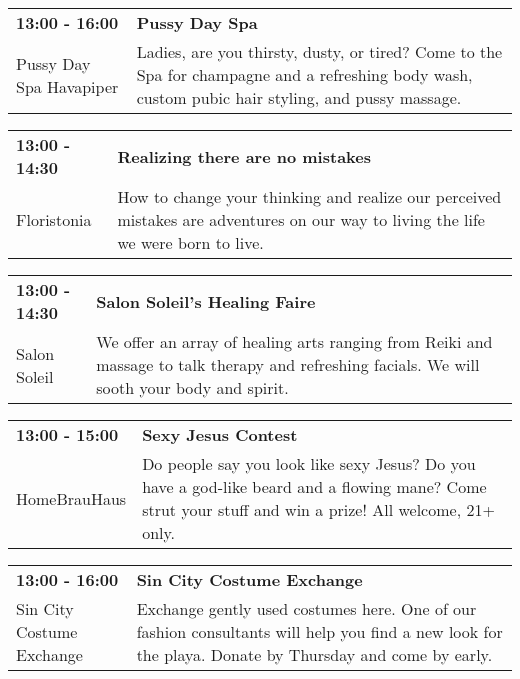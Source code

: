 \begin{tabular}{ p{1in} p{2.2in} }
    \textbf{13:00 - 16:00} & \textbf{Pussy Day Spa} \\
    Pussy Day Spa \newline Havapiper & Ladies, are you thirsty, dusty, or tired? Come to the Spa for champagne and a refreshing body wash, custom pubic hair styling, and pussy massage. \\
    \hline 
\end{tabular}
    
\begin{tabular}{ p{1in} p{2.2in} }
    \textbf{13:00 - 14:30} & \textbf{Realizing there are no mistakes} \\
    Floristonia \newline  & How to change your thinking and realize our perceived mistakes are adventures on our way to living the life we were born to live. \\
    \hline 
\end{tabular}
    
\begin{tabular}{ p{1in} p{2.2in} }
    \textbf{13:00 - 14:30} & \textbf{Salon Soleil's Healing Faire} \\
    Salon Soleil \newline  & We offer an array of healing arts ranging from Reiki and massage to talk therapy and refreshing facials. We will sooth your body and spirit. \\
    \hline 
\end{tabular}
    
\begin{tabular}{ p{1in} p{2.2in} }
    \textbf{13:00 - 15:00} & \textbf{Sexy Jesus Contest} \\
    HomeBrauHaus \newline  & Do people say you look like sexy Jesus? Do you have a god-like beard and a flowing mane? Come strut your stuff and win a prize! All welcome, 21+ only. \\
    \hline 
\end{tabular}
    
\begin{tabular}{ p{1in} p{2.2in} }
    \textbf{13:00 - 16:00} & \textbf{Sin City Costume Exchange} \\
    Sin City Costume Exchange \newline  & Exchange gently used costumes here. One of our fashion consultants will help you find a new look for the playa. Donate by Thursday and come by early. \\
    \hline 
\end{tabular}
    

